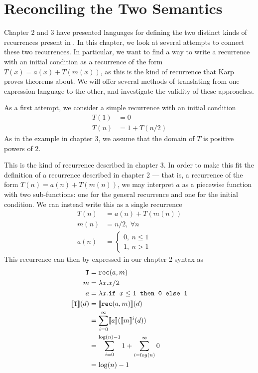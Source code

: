 \chapter{Reconciling the Two Semantics}
Chapter 2 and 3 have presented languages for defining the two distinct kinds of recurrences present in \cite{Karp}. 
In this chapter, we look at several attempts to connect these two recurrences. In particular, we want to find a way 
to write a recurrence with an initial condition as a recurrence of the form $T(x) = a(x) + T(m(x))$, as this is the kind
of recurrence that Karp proves theorems about. We will offer
several methods of translating from one expression language to the other, and investigate the validity of these 
approaches.

As a first attempt, we consider a simple recurrence with an initial condition
\begin{align*}
T(1) &= 0 \\
T(n) &= 1 + T(n/2 ) 
\end{align*}
As in the example in chapter 3, we assume that the domain of $T$ is positive powers of $2$.

This is the kind of recurrence described in chapter 3. In order to make this fit the definition of a recurrence described in 
chapter 2 --- that is, a recurrence of the form $T(n) = a(n) + T(m(n))$, we may interpret $a$ as a 
piecewise function with two sub-functions: one for the general recurrence and one for the initial condition.
We can instead write this as a single recurrence
\begin{align*}
T(n) &= a(n) + T(m(n)) \\
m(n) &= n/2, \ \forall n \\ 
a(n) &=
\begin{cases} 
0, \ n \leq 1 \\
1, \ n > 1
\end{cases}
\end{align*} 
This recurrence can then by expressed in our chapter 2 syntax as 
\begin{align*}
\texttt{T} &= \texttt{rec}(a,m) \\
m &= \lambda x.x/\texttt{2} \\
a &= \lambda x.\texttt{if } x\leq\texttt{1} \texttt{ then } \texttt{0} \texttt{ else } \texttt{1} \\
\llbracket \texttt{T} \rrbracket(d) &= \llbracket \texttt{rec}(a,m) \rrbracket(d) \\
&= \sum_{i=0}^{\infty}\llbracket a \rrbracket(\llbracket m\rrbracket^i(d)) \\
&= \sum_{i=0}^{\log(n)-1} 1 + \sum_{i=log(n)}^{\infty} 0 \\
&= \log(n) - 1
\end{align*}

